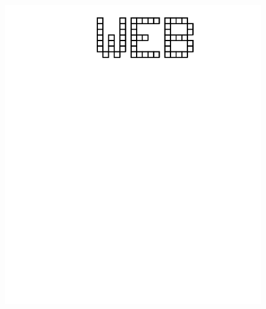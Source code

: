 \documentclass[17pt]{extreport}
\begin{document}
	\begin{figure}
		\centering
		\includegraphics[width=6.25in]{imageserver/uploadimages/web.png}
	\end{figure}
\end{document}
